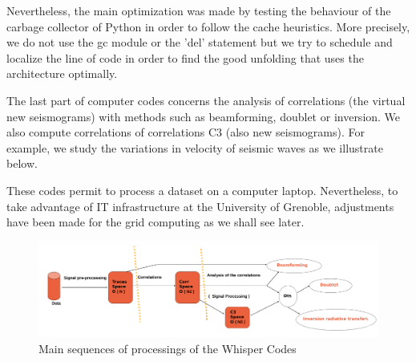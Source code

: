\documentclass[a4paper, 10pt]{article}
\begin{document}
\begin{multicols}{2}
Nevertheless, the main optimization was made by testing the behaviour of the carbage collector of Python in order to follow the cache heuristics. More precisely, we do not use the gc module or the 'del' statement but we try to schedule and localize the line of code in order to find the good unfolding that uses the architecture optimally.

The last part of computer codes concerns the analysis of correlations (the virtual new seismograms) with methods such as beamforming, doublet or inversion.
We also compute correlations of correlations C3 (also new seismograms). For example, we study the variations
in velocity of seismic waves as we illustrate below. 

These codes permit to process a dataset on a computer laptop. 
Nevertheless, to take advantage of IT infrastructure at the University of Grenoble, 
adjustments have been made for the grid computing as we shall see later.

\end{multicols}
\begin{figure}[h]
\centering
\caption{\label{whisperGeneralWorflow} Main sequences of processings of the Whisper Codes}
\includegraphics[width=16cm]{briandPosterAGU2013GimpProcessing.png}
\end{figure}
\end{document}
